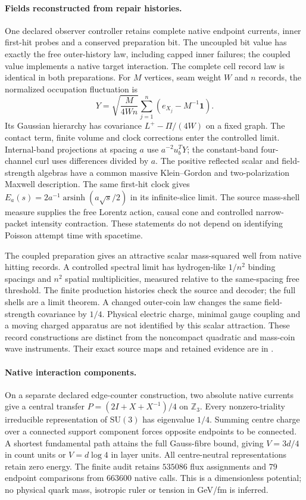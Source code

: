\paragraph{Fields reconstructed from repair histories.}
One declared observer controller retains complete native endpoint currents,
inner first-hit probes and a conserved preparation bit. The uncoupled bit
value has exactly the free outer-history law, including capped inner failures;
the coupled value implements a native target interaction. The complete cell
record law is identical in both preparations. For $M$ vertices, seam weight
$W$ and $n$ records, the normalized occupation fluctuation is
\[
 Y=\sqrt{\frac{M}{4Wn}}\sum_{j=1}^n(e_{X_j}-M^{-1}\mathbf1).
\]
Its Gaussian hierarchy has covariance $L^+-\Pi/(4W)$ on a fixed graph.
The contact term, finite volume and clock corrections enter the controlled
limit. Internal-band projections at spacing $a$ use $a^{-2}u_b^TY$;
the constant-band four-channel curl uses differences divided by $a$.
The positive reflected scalar and field-strength algebras have a common
massive Klein--Gordon and two-polarization Maxwell description. The same
first-hit clock gives
$E_a(s)=2a^{-1}\operatorname{arsinh}(a\sqrt{s}/2)$ in its infinite-slice
limit. The source mass-shell measure supplies the free Lorentz action,
causal cone and controlled narrow-packet intensity contraction. These
statements do not depend on identifying Poisson attempt time with spacetime.

The coupled preparation gives an attractive scalar mass-squared well from
native hitting records. A controlled spectral limit has hydrogen-like
$1/n^2$ binding spacings and $n^2$ spatial multiplicities, measured relative
to the same-spacing free threshold. The finite production histories check
the source and decoder; the full shells are a limit theorem. A changed
outer-coin law changes the same field-strength covariance by $1/4$.
Physical electric charge, minimal gauge coupling and a moving charged
apparatus are not identified by this scalar attraction. These record
constructions are distinct from the noncompact quadratic and mass-coin
wave instruments. Their exact source maps and retained evidence are in
.

\paragraph{Native interaction components.}
On a separate declared edge-counter construction, two absolute native
currents give a central transfer
$P=(2I+X+X^{-1})/4$ on $\mathbb Z_3$. Every nonzero-triality irreducible
representation of $\mathrm{SU}(3)$ has eigenvalue $1/4$. Summing centre
charge over a connected support component forces opposite endpoints to
be connected. A shortest fundamental path attains the full Gauss-fibre
bound, giving $V=3d/4$ in count units or $V=d\log4$ in layer units.
All centre-neutral representations retain zero energy. The finite audit
retains $535086$ flux assignments and $79$ endpoint comparisons from
$663600$ native calls. This is a dimensionless potential; no physical
quark mass, isotropic ruler or tension in GeV/fm is inferred.

